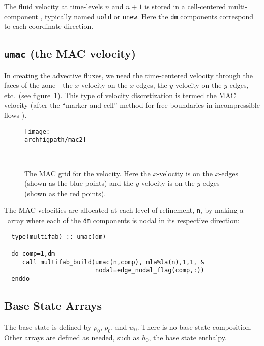 The fluid velocity at time-levels $n$ and $n+1$ is stored in
a cell-centered multi-component \multifab, typically named
{\tt uold} or {\tt unew}.  Here the {\tt dm}
components correspond to each coordinate direction.

\subsection{{\tt umac} (the MAC velocity)}

In creating the advective fluxes, we need the time-centered velocity
through the faces of the zone---the $x$-velocity on the $x$-edges, the
$y$-velocity on the $y$-edges, etc.\ (see figure~\ref{fig:mac}).  This
type of velocity discretization is termed the MAC velocity (after the
``marker-and-cell'' method for free boundaries in incompressible
flows \cite{harlowwelch:1965}).



\begin{figure}[h]
\centering
\texttt{[image: \\archfigpath/mac2]}
\hspace{0.1in}
\begin{minipage}[b]{3.8in}
\caption[The MAC grid]
{\label{fig:mac} The MAC grid for the velocity.  
Here the $x$-velocity is on the $x$-edges (shown as the 
blue points) and the $y$-velocity is on the $y$-edges
(shown as the red points).
}\ \\
\end{minipage}
\end{figure}

The MAC velocities are allocated at each level of refinement, {\tt n},
by making a \multifab\ array where each of the {\tt dm} components is
nodal in its respective direction:
\begin{verbatim}
  type(multifab) :: umac(dm)

  do comp=1,dm
     call multifab_build(umac(n,comp), mla%la(n),1,1, &
                         nodal=edge_nodal_flag(comp,:))
  enddo
\end{verbatim}



\subsection{Base State Arrays}

The base state is defined by $\rho_0$, $p_0$, and $w_0$.  There is no
base state composition.  Other arrays are defined as needed, such as
$h_0$, the base state enthalpy.

